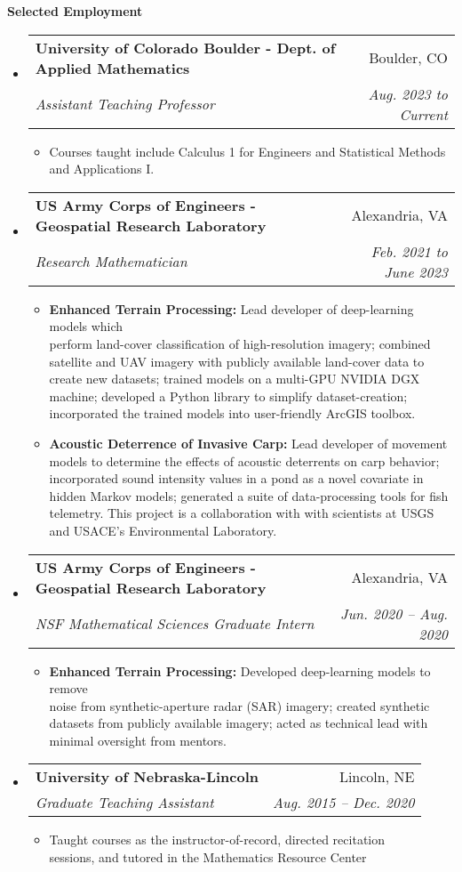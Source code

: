 \documentclass[letterpaper,11pt]{article}
\makeatletter
\newcommand{\resitem}[1]{\item #1 \vspace{-2pt}}
\newcommand{\resheading}[1]{{\large \colorbox{mygrey}{\begin{minipage}{\textwidth}{\textbf{#1 \vphantom{p\^{E}}}}\end{minipage}}}}
\newcommand{\ressubheading}[4]{
\begin{tabular*}{6.5in}{l@{\extracolsep{\fill}}r}
		\textbf{#1} & #2 \\
		\textit{#3} & \textit{#4} \\
\end{tabular*}\vspace{-6pt}}
\makeatother
\begin{document}
\resheading{Selected Employment}
	\begin{itemize}
		\item
		\ressubheading{University of Colorado Boulder - Dept. of Applied Mathematics}{Boulder, CO}{Assistant Teaching Professor}{Aug. 2023 to Current}
		{\footnotesize
			\begin{itemize}
				\item Courses taught include Calculus 1 for Engineers and Statistical Methods and Applications I.
			\end{itemize}
		}
		\item
		\ressubheading{US Army Corps of Engineers - Geospatial Research Laboratory}{Alexandria, VA}{Research Mathematician}{Feb. 2021 to June 2023}
		{\footnotesize
			\begin{itemize}
				\resitem{\textbf{Enhanced Terrain Processing:} Lead developer of deep-learning models which \\ perform land-cover classification of high-resolution imagery; combined satellite and UAV imagery with publicly available land-cover data to create new datasets; trained models on a multi-GPU NVIDIA DGX machine; developed a Python library to simplify dataset-creation; incorporated the trained models into user-friendly ArcGIS toolbox.}
				\resitem{\textbf{Acoustic Deterrence of Invasive Carp:} Lead developer of movement models to determine the effects of acoustic deterrents on carp behavior; incorporated sound intensity values in a pond as a novel covariate in hidden Markov models; generated a suite of data-processing tools for fish telemetry. This project is a collaboration with with scientists at USGS and USACE's Environmental Laboratory.}
			\end{itemize}
		}
	
	\newpage
	
		\item
		\ressubheading{US Army Corps of Engineers - Geospatial Research Laboratory}{Alexandria, VA}{NSF Mathematical Sciences Graduate Intern}{Jun. 2020 -- Aug. 2020}
		{\footnotesize
			\begin{itemize}
				\resitem{\textbf{Enhanced Terrain Processing:} Developed deep-learning models to remove \\ noise from synthetic-aperture radar (SAR) imagery; created synthetic datasets from publicly available imagery; acted as technical lead with minimal oversight from mentors.}
		\end{itemize}}

		\item
			{\ressubheading{University of Nebraska-Lincoln}{Lincoln, NE}{Graduate Teaching Assistant}{Aug. 2015 -- Dec. 2020}
				{ \footnotesize
				\begin{itemize}
					\resitem{Taught courses as the instructor-of-record, directed recitation \\ sessions, and tutored in the Mathematics Resource Center}
				\end{itemize}}}


\end{itemize}
\end{document}
